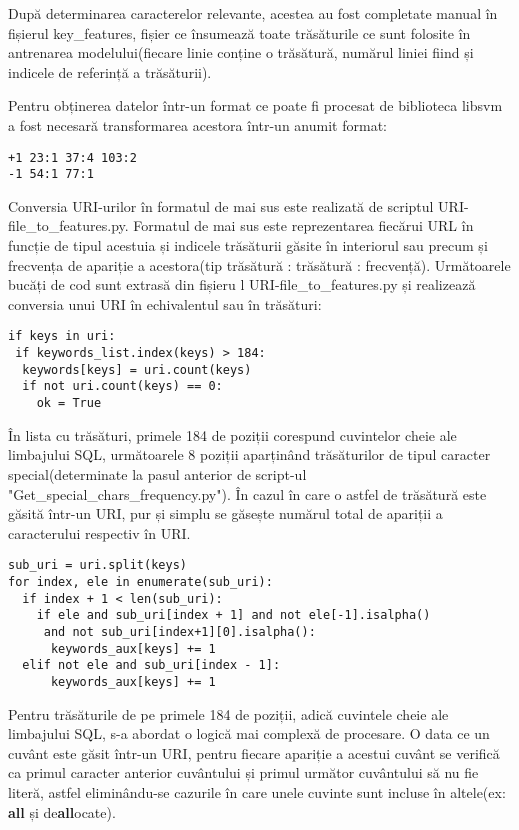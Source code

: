 După determinarea caracterelor relevante, acestea au fost completate manual în fișierul key\_features, fișier ce însumează toate trăsăturile ce sunt folosite în antrenarea modelului(fiecare linie conține o trăsătură, numărul liniei fiind și indicele de referință a trăsăturii). 

Pentru obținerea datelor într-un format ce poate fi procesat de biblioteca libsvm \cite{libsvm} a fost necesară transformarea acestora într-un anumit format: 

\begin{lstlisting}
+1 23:1 37:4 103:2
-1 54:1 77:1
\end{lstlisting}

Conversia URI-urilor în formatul de mai sus este realizată de scriptul  URI-file\_to\_features.py.  Formatul de mai sus este reprezentarea fiecărui URL în funcție de tipul acestuia și indicele trăsăturii găsite în interiorul sau precum și frecvența de apariție a acestora(tip trăsătură : trăsătură : frecvență). Următoarele bucăți de cod sunt extrasă din fișieru l URI-file\_to\_features.py  și realizează conversia unui URI în echivalentul sau în trăsături: 

\begin{lstlisting}
if keys in uri:
 if keywords_list.index(keys) > 184:
  keywords[keys] = uri.count(keys)
  if not uri.count(keys) == 0:
    ok = True
\end{lstlisting}

În lista cu trăsături, primele 184 de poziții corespund cuvintelor cheie ale limbajului SQL, următoarele 8 poziții aparținând trăsăturilor de tipul caracter special(determinate la pasul anterior de script-ul "Get\_special\_chars\_frequency.py"). În cazul în care o astfel de trăsătură este găsită într-un URI, pur și simplu se găsește numărul total de apariții a caracterului respectiv în URI. 


\begin{lstlisting}
sub_uri = uri.split(keys)
for index, ele in enumerate(sub_uri):
  if index + 1 < len(sub_uri):
    if ele and sub_uri[index + 1] and not ele[-1].isalpha()
     and not sub_uri[index+1][0].isalpha():
      keywords_aux[keys] += 1
  elif not ele and sub_uri[index - 1]:
      keywords_aux[keys] += 1
\end{lstlisting}

Pentru trăsăturile de pe primele 184 de poziții, adică cuvintele cheie ale limbajului SQL, s-a abordat o logică mai complexă de procesare. O data ce un cuvânt este găsit într-un URI, pentru fiecare apariție a acestui cuvânt se verifică ca primul caracter anterior cuvântului și primul următor cuvântului să nu fie literă, astfel eliminându-se cazurile în care unele cuvinte sunt incluse în altele(ex:  \textbf{all} și de\textbf{all}ocate).

